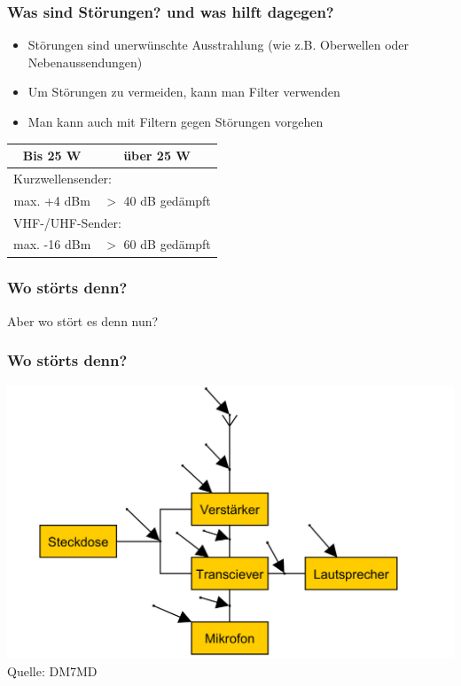 \begin{frame}
	\frametitle{Was sind Störungen? und was hilft dagegen?}
	\begin{itemize}
		\item Störungen sind unerwünschte Ausstrahlung (wie z.B. Oberwellen oder 								Nebenaussendungen)
		\item Um Störungen zu vermeiden, kann man Filter verwenden
		\item Man kann auch mit Filtern gegen Störungen vorgehen
	\end{itemize}
	\vspace{0.5cm}
	\begin{center}
	\begin{tabular}{|c|c|}
		\hline
		Bis 25 W & über 25 W \\ \hline
		\multicolumn{2}{|l|}{Kurzwellensender:} \\ \hline
		max. +4 dBm & $>$ 40 dB gedämpft	\\ \hline
		\multicolumn{2}{|l|}{VHF-/UHF-Sender:} \\ \hline
		max. -16 dBm & $>$ 60 dB gedämpft \\ \hline
	\end{tabular}
	\end{center}
	
\end{frame}

\begin{frame}
	\frametitle{Wo störts denn?}
	\Large{Aber wo stört es denn nun?}
\end{frame}

\begin{frame}
 	\frametitle{Wo störts denn?}
 	\includegraphics[scale=0.2]{e18/Stoerungen.png}\\
 	\tiny{Quelle: DM7MD} 	
\end{frame}

